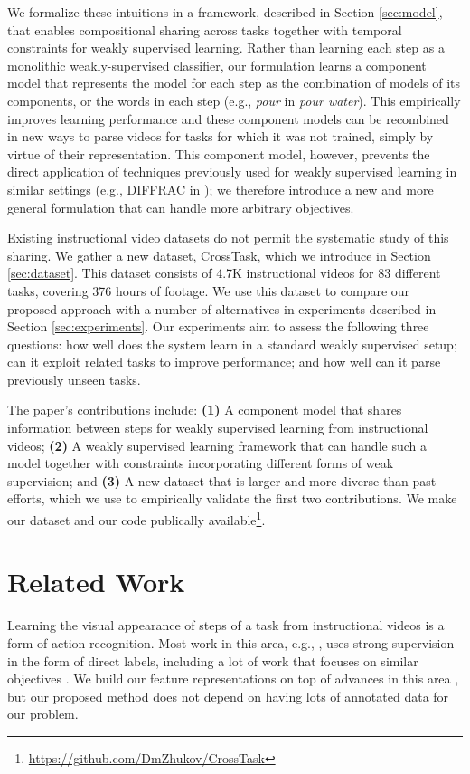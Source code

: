 \documentclass[10pt,twocolumn,letterpaper]{article}
\begin{document}
We formalize these intuitions in a framework, described in Section \ref{sec:model}, that
enables compositional sharing across tasks together with temporal constraints for
weakly supervised learning. Rather than learning each step as
a monolithic weakly-supervised classifier, our formulation learns a component model
that represents the model for each step as the combination of models of its components, or
the words in each step (e.g., {\it pour} in {\it pour water}).
This empirically improves learning performance and these component
models can be recombined in new ways to parse videos for tasks for which
it was not trained, simply by virtue of their representation.
This component model, however, prevents the direct application of techniques
previously used for weakly supervised learning in similar settings
(e.g., DIFFRAC \cite{Bach07diffrac} in
\cite{alayrac16objectstates}); we therefore introduce a new and more general
formulation that can handle more arbitrary objectives.

Existing instructional video datasets do not
permit the systematic study of this sharing. We gather a new dataset, CrossTask,
which we introduce in Section \ref{sec:dataset}. This dataset consists
of 4.7K instructional videos for 83 different tasks, covering 376 hours of
footage. We use this dataset to compare our proposed approach with a number of
alternatives in experiments described in Section \ref{sec:experiments}.
Our experiments aim to assess the following three questions: how well does the
system learn in a standard weakly supervised setup; can it exploit related
tasks to improve performance; and how well can it parse previously unseen
tasks.

The paper's contributions include:
{\bf (1)} A component model that shares information between steps for
weakly supervised learning from instructional videos; {\bf (2)} A weakly
supervised learning framework that can handle such a model together with
constraints incorporating different forms of weak supervision; and {\bf (3)}
A new dataset that is larger and more diverse than past efforts, which
we use to empirically validate the first two contributions. We make our dataset and our code publically available\footnote{\url{https://github.com/DmZhukov/CrossTask}\label{fn:dataset}}.

\section{Related Work}
\label{sec:related_work}
Learning the visual appearance of steps of a task from
instructional videos is a form of action recognition.
Most work in this area, e.g.,
\cite{carreira17quovadis,simonyan2014two,Wang13action}, uses strong supervision
in the form of direct labels, including a lot of work that focuses on similar
objectives \cite{Damen2018,Fang2018,Fouhey18}.
We build our feature representations on top of advances in this area \cite{carreira17quovadis}, but our proposed method does not depend on having lots of annotated data for our problem.
\end{document}
